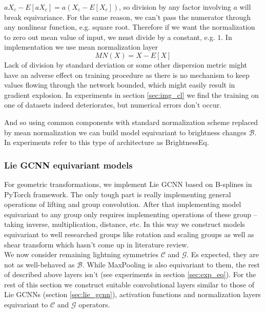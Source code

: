 \begin{itemize}
        $aX_c-E[aX_c]=a(X_c-E[X_c])$, so division by any factor involving $a$
        will break equivariance. For the same reason, we can't pass the
        numerator through any nonlinear function, e.g. square root.
        Therefore if we want the normalization to zero
        out mean value of input, we must divide by a constant, e.g. $1$.
        In implementation we use mean normalization layer
        \begin{equation}
            \mathit{MN}(X) = X - E[X]
            \label{eq:mn}
        \end{equation}
        Lack of division by standard deviation or some other dispersion metric
        might have an
        adverse effect on training procedure as there is no mechanism to keep
        values flowing through the network bounded, which might easily result in
        gradient explosion. In experiments in section \ref{sec:img_cl} we find
        the training on one of datasets indeed deteriorates, but numerical errors
        don't occur.
\end{itemize}
And so using common components with standard normalization scheme replaced by
mean normalization we can build model equivariant to brightness changes
$\mathcal{B}$. In
experiments refer to this type of architecture as BrightnessEq.

\subsubsection{Lie GCNN equivariant models}
For geometric transformations, we implement Lie GCNN
based on B-splines \cite{bekkers2019} in PyTorch framework.
The only tough part is really
implementing general operations of lifting and group convolution.
After that implementing model equivariant to any group only requires implementing operations
of these group -- taking inverse, multiplication, distance, etc.
In this way we construct models equivariant to well researched groups like
rotation and
scaling groups as well as shear transform which hasn't come up in literature
review.
\\

We now consider remaining lightning symmetries $\mathcal{C}$ and $\mathcal{G}$.
Es expected, they are not
as well-behaved as $\mathcal{B}$. While MaxPooling is also equivariant to them,
the rest
of described above layers isn't (see experiments in section \ref{sec:exp_eq}).
For the rest of this section we construct suitable
convolutional layers similar to those of Lie
GCNNs (section \ref{sec:lie_gcnn}),
activation functions and
normalization layers
equivariant to $\mathcal{C}$ and $\mathcal{G}$ operators.

